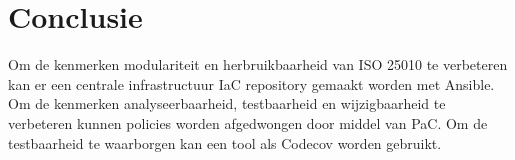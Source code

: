 \section{Conclusie}
Om de kenmerken modulariteit en herbruikbaarheid van ISO 25010 te verbeteren kan er een centrale infrastructuur IaC repository gemaakt worden met Ansible. Om de kenmerken analyseerbaarheid, testbaarheid en wijzigbaarheid te verbeteren kunnen policies worden afgedwongen door middel van PaC. Om de testbaarheid te waarborgen kan een tool als Codecov worden gebruikt.